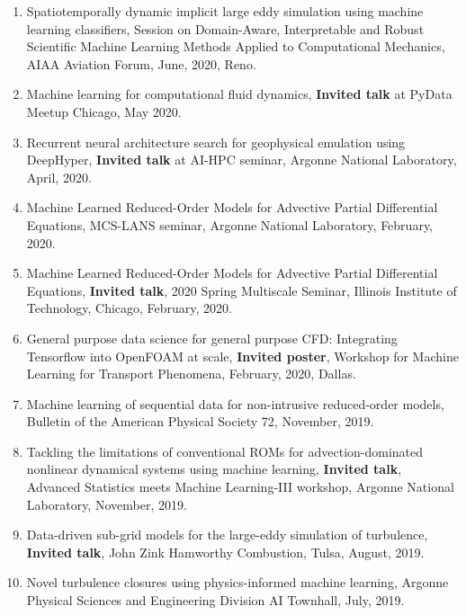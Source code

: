 \documentclass[letterpaper]{article}
\begin{document}
\begin{enumerate}
\item Spatiotemporally dynamic implicit large eddy simulation using machine learning classifiers, Session on Domain-Aware, Interpretable and Robust Scientific Machine Learning Methods Applied to Computational Mechanics, AIAA Aviation Forum, June, 2020, Reno. 

\item Machine learning for computational fluid dynamics, \textbf{Invited talk} at PyData Meetup Chicago, May 2020.

\item Recurrent neural architecture search for geophysical emulation using DeepHyper, \textbf{Invited talk} at AI-HPC seminar, Argonne National Laboratory, April, 2020.

\item Machine Learned Reduced-Order Models for Advective Partial Differential Equations, MCS-LANS seminar, Argonne National Laboratory, February, 2020.

\item Machine Learned Reduced-Order Models for Advective Partial Differential Equations, \textbf{Invited talk}, 2020 Spring Multiscale Seminar, Illinois Institute of Technology, Chicago, February, 2020.

\item General purpose data science for general purpose CFD: Integrating Tensorflow into OpenFOAM at scale, \textbf{Invited poster}, Workshop for Machine Learning for Transport Phenomena, February, 2020, Dallas.

\item Machine learning of sequential data for non-intrusive reduced-order models, Bulletin of the American Physical Society 72, November, 2019.

\item Tackling the limitations of conventional ROMs for advection-dominated nonlinear dynamical systems using machine learning, \textbf{Invited talk}, Advanced Statistics meets Machine Learning-III workshop, Argonne National Laboratory, November, 2019.

\item Data-driven sub-grid models for the large-eddy simulation of turbulence, \textbf{Invited talk}, John Zink Hamworthy Combustion, Tulsa, August, 2019.

\item Novel turbulence closures using physics-informed machine learning, Argonne Physical Sciences and Engineering Division AI Townhall, July, 2019. 


\end{enumerate}
\end{document}
